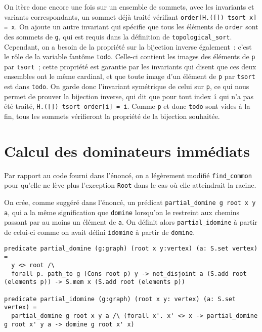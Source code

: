 \documentclass[a4paper,10pt]{article}
\begin{document}
On itère donc encore une fois sur un ensemble de sommets, avec les invariants et variants correspondants, un sommet déjà traité vérifiant \lstinline{order[H.([]) tsort x] = x}. On ajoute un autre invariant qui spécifie que tous les éléments de \lstinline{order} sont des sommets de \lstinline{g}, qui est requis dans la définition de \lstinline{topological_sort}. Cependant, on a besoin de la propriété sur la bijection inverse également~: c'est le rôle de la variable fantôme \lstinline{todo}. Celle-ci contient les images des éléments de \lstinline{p} par \lstinline{tsort}~; cette propriété est garantie par les invariants qui disent que ces deux ensembles ont le même cardinal, et que toute image d'un élément de \lstinline{p} par \lstinline{tsort} est dans \lstinline{todo}. On garde donc l'invariant symétrique de celui sur \lstinline{p}, ce qui nous permet de prouver la bijection inverse, qui dit que pour tout index \lstinline{i} qui n'a pas été traité, \lstinline{H.([]) tsort order[i] = i}. Comme \lstinline{p} et donc \lstinline{todo} sont vides à la fin, tous les sommets vérifieront la propriété de la bijection souhaitée.

\section{Calcul des dominateurs immédiats}

Par rapport au code fourni dans l'énoncé, on a légèrement modifié \lstinline{find_common} pour qu'elle ne lève plus l'exception \lstinline{Root} dans le cas où elle atteindrait la racine.

On crée, comme suggéré dans l'énoncé, un prédicat \lstinline{partial_domine g root x y a}, qui a la même signification que \lstinline{domine} lorsqu'on le restreint aux chemins passant par au moins un élément de \lstinline{a}. On définit alors \lstinline{partial_idomine} à partir de celui-ci comme on avait défini \lstinline{idomine} à partir de \lstinline{domine}.

\begin{lstlisting}
predicate partial_domine (g:graph) (root x y:vertex) (a: S.set vertex) =
  y <> root /\
  forall p. path_to g (Cons root p) y -> not_disjoint a (S.add root (elements p)) -> S.mem x (S.add root (elements p))

predicate partial_idomine (g:graph) (root x y: vertex) (a: S.set vertex) =
  partial_domine g root x y a /\ (forall x'. x' <> x -> partial_domine g root x' y a -> domine g root x' x)
\end{lstlisting}
\end{document}

